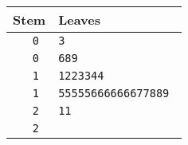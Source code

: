 \begin{tabular}{r|l}
  Stem  & Leaves \\
  \hline
  \tt 0 & \tt 3 \\
  \tt 0 & \tt 689 \\
  \tt 1 & \tt 1223344 \\
  \tt 1 & \tt 55555666666677889 \\
  \tt 2 & \tt 11 \\
  \tt 2 & \\
\end{tabular}		